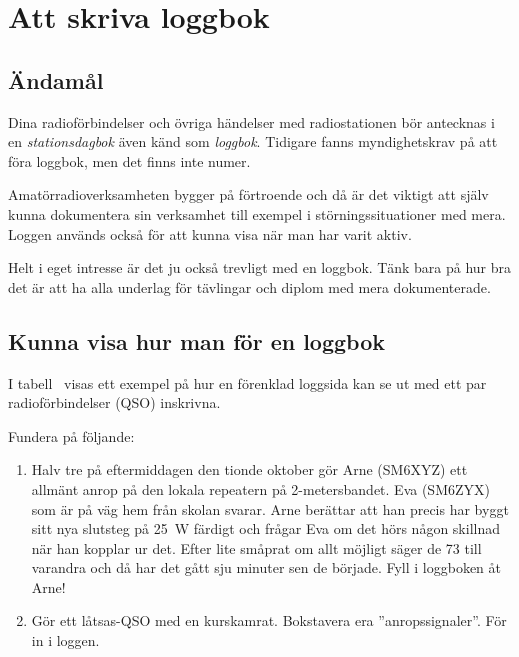 \chapter{Att skriva loggbok}


\section{Ändamål}

Dina radioförbindelser och övriga händelser med radiostationen bör antecknas i
en \emph{stationsdagbok} även känd som \emph{loggbok}.
Tidigare fanns myndighetskrav på att föra loggbok, men det finns inte numer.

Amatörradioverksamheten bygger på förtroende och då är det viktigt att själv
kunna dokumentera sin verksamhet till exempel i störningssituationer med mera.
Loggen används också för att kunna visa när man har varit aktiv.

Helt i eget intresse är det ju också trevligt med en loggbok.
Tänk bara på hur bra det är att ha alla underlag för tävlingar och diplom med
mera dokumenterade.

\section{Kunna visa hur man för en loggbok}

I tabell~ visas ett exempel på hur en förenklad loggsida kan
se ut med ett par radioförbindelser (QSO) inskrivna.

Fundera på följande:
\begin{enumerate}
\item Halv tre på eftermiddagen den tionde oktober gör Arne (SM6XYZ)
  ett allmänt anrop på den lokala repeatern på 2-metersbandet.
  Eva (SM6ZYX) som är på väg hem från skolan svarar.
  Arne berättar att han precis har byggt sitt nya slutsteg på \qty{25}{\watt}
  färdigt och frågar Eva om det hörs någon skillnad när han kopplar ur det.
  Efter lite småprat om allt möjligt säger de 73 till varandra och då har det
  gått sju minuter sen de började.
  Fyll i loggboken åt Arne!
\item Gör ett låtsas-QSO med en kurskamrat.
  Bokstavera era ''anropssignaler''.
  För in i loggen.
\end{enumerate}

